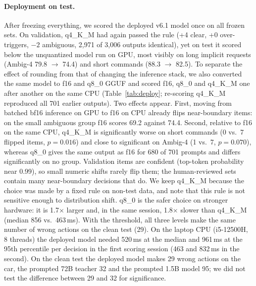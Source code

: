 \paragraph{Deployment on test.} After freezing everything, we scored the deployed v6.1 model once on all frozen sets. On
validation, q4\_K\_M had again passed the rule (+4 clear, +0 over-triggers, $-2$ ambiguous, 2,971 of 3,006 outputs identical),
yet on test it scored below the unquantized model run on GPU, most visibly on long implicit requests (Ambig-4 79.8
$\rightarrow$ 74.4) and short commands (88.3 $\rightarrow$ 82.5). To separate the effect of rounding from that of changing the
inference stack, we also converted the same model to f16 and q8\_0 GGUF and scored f16, q8\_0 and q4\_K\_M one after another on
the same CPU (Table~\ref{tab:deploy}; re-scoring q4\_K\_M reproduced all 701 earlier outputs). Two effects appear. First,
moving from batched bf16 inference on GPU to f16 on CPU already flips near-boundary items: on the small ambiguous group f16
scores 69.2 against 74.4. Second, relative to f16 on the same CPU, q4\_K\_M is significantly worse on short commands (0 vs.\ 7
flipped items, $p=0.016$) and close to significant on Ambig-4 (1 vs.\ 7, $p=0.070$), whereas q8\_0 gives the same output as
f16 for 680 of 701 prompts and differs significantly on no group. Validation items are confident (top-token probability near
0.99), so small numeric shifts rarely flip them; the human-reviewed sets contain many near-boundary decisions that do. We keep
q4\_K\_M because the choice was made by a fixed rule on non-test data, and note that this rule is not sensitive enough to
distribution shift. q8\_0 is the safer choice on stronger hardware: it is 1.7$\times$ larger and, in the same session, 1.8$\times$
slower than q4\_K\_M (median 856 vs.\ 463\,ms). With the threshold, all three levels make the same number of wrong actions on
the clean test (29). On the laptop CPU (i5-12500H, 8 threads) the deployed model needed 520\,ms at the median and 961\,ms at
the 95th percentile per decision in the first scoring session (463 and 832\,ms in the second). On the clean test the
deployed model makes 29 wrong actions on the car, the prompted 72B teacher 32 and the prompted 1.5B model 95; we did not test
the difference between 29 and 32 for significance.

